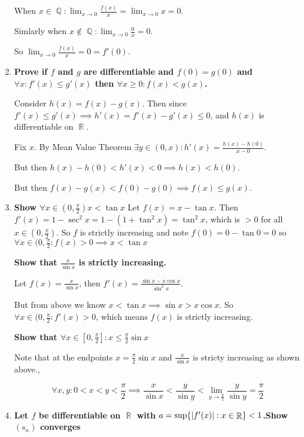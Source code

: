 \documentclass[10pt,a4paper]{article}
\DeclareMathOperator*{\R}{\mathbb{R}}
\DeclareMathOperator*{\Q}{\mathbb{Q}}
\DeclarePairedDelimiter{\abs}{\lvert}{\rvert}
\begin{document}
\begin{enumerate}
        When $x \in \Q: \lim_{x\to 0} \frac{f(x)}{x} = \lim_{x \to 0} x = 0$.

        Simlarly when $x \not \in \Q: \lim_{x\to 0} \frac{0}{x} = 0$.

        So $\lim_{x \to 0} \frac{f(x)}{x} = 0 = f'(0)$.
    
    \item \textbf{Prove if $f$ and $g$ are differentiable and $f(0)=g(0)$ and $\forall x : f'(x) \leq g'(x)$ then $\forall x \geq 0 : f(x) < g(x)$.}

        Consider $h(x) = f(x) -g(x)$. Then since $f'(x) \leq g'(x) \implies  h'(x) = f'(x) - g'(x) \leq 0$, and $h(x)$ is differentiable on $\R$. 

        Fix $x$. By Mean Value Theorem $\exists y \in (0, x): h'(x) = \frac{h(x) - h(0)}{x-0}$. 

        But then $ h(x)- h(0) < h'(x) < 0 \implies h(x) < h(0)$.

        But then $f(x) - g(x)  < f(0) - g(0) \implies f(x) \leq g(x)$.

    \item \textbf{Show $\forall x \in (0, \frac{\pi}{2}) x < \tan x $}
        Let $f(x) = x - \tan x$. Then $f'(x) = 1 - \sec^2 x = 1 - (1 + \tan^2 x) = \tan^2 x$, which is $>0$ for all $x \in (0, \frac{\pi}{2})$. So $f$ is strictly increasing and note $f(0) = 0 - \tan 0 = 0$ so $\forall x \in (0, \frac{\pi}{2} : f(x) > 0  \implies x < \tan x$

    \textbf{Show that $\frac{x}{\sin x}$ is strictly increasing. }

        Let $f(x) = \frac{x}{\sin x}$, then $f'(x) = \frac{\sin x - x \cos x }{\sin^2 x}$. 

        But from above we know $x < \tan x \implies \sin x > x \cos x$. So $\forall x \in (0, \frac{\pi}{2}: f'(x) > 0 $, which means $f(x)$ is strictly increasing.

    \textbf{Show that $\forall x \in [0, \frac{\pi}{2}]: x \leq \frac{\pi}{2} \sin x$}

        Note that at the endpoints $x = \frac{\pi}{2} \sin x$ and $\frac{x}{\sin x}$ is stricty increasing as shown above.,

        $$\forall x, y: 0 < x < y< \frac{\pi}{2} \implies \frac{x}{\sin x} < \frac{y}{\sin y} < \lim_{y \to \frac{\pi}{2}} \frac{y}{\sin y} = \frac{\pi}{2}$$

    \item \textbf{Let $f$ be differentiable on $\R$ with $a = \sup \{ \abs{f'(x)} : x \in \R \} < 1$.Show $(s_n)$ converges}
        

\end{enumerate}
\end{document}
